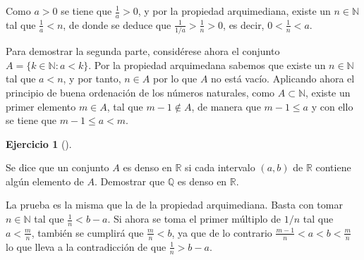 \documentclass[
  a4paper,
]{scrreport}
\theoremstyle{definition}
\newtheorem{exercise}{Ejercicio}[chapter]
\theoremstyle{remark}
\begin{document}
\begin{tcolorbox}[enhanced jigsaw, coltitle=black, toptitle=1mm, colframe=quarto-callout-tip-color-frame, colbacktitle=quarto-callout-tip-color!10!white, breakable, opacityback=0, bottomtitle=1mm, opacitybacktitle=0.6, title=\textcolor{quarto-callout-tip-color}{\faLightbulb}\hspace{0.5em}{Solución}, arc=.35mm, leftrule=.75mm, toprule=.15mm, titlerule=0mm, bottomrule=.15mm, left=2mm, rightrule=.15mm, colback=white]

Como \(a>0\) se tiene que \(\frac{1}{a}>0\), y por la propiedad
arquimediana, existe un \(n\in\mathbb{N}\) tal que \(\frac{1}{a}<n\), de
donde se deduce que \(\frac{1}{1/a}>\frac{1}{n}>0\), es decir,
\(0<\frac{1}{n}<a\).

Para demostrar la segunda parte, considérese ahora el conjunto
\(A=\{k\in \mathbb{N}: a<k\}\). Por la propiedad arquimedana sabemos que
existe un \(n\in \mathbb{N}\) tal que \(a<n\), y por tanto, \(n\in A\)
por lo que \(A\) no está vacío. Aplicando ahora el principio de buena
ordenación de los números naturales, como \(A\subset \mathbb{N}\),
existe un primer elemento \(m\in A\), tal que \(m-1\not\in A\), de
manera que \(m-1\leq a\) y con ello se tiene que \(m-1\leq a<m\).

\end{tcolorbox}

\begin{exercise}[]\protect\hypertarget{exr-densidad-racionales}{}\label{exr-densidad-racionales}

Se dice que un conjunto \(A\) es denso en \(\mathbb{R}\) si cada
intervalo \((a,b)\) de \(\mathbb{R}\) contiene algún elemento de \(A\).
Demostrar que \(\mathbb{Q}\) es denso en \(\mathbb{R}\).

\end{exercise}

\begin{tcolorbox}[enhanced jigsaw, coltitle=black, toptitle=1mm, colframe=quarto-callout-tip-color-frame, colbacktitle=quarto-callout-tip-color!10!white, breakable, opacityback=0, bottomtitle=1mm, opacitybacktitle=0.6, title=\textcolor{quarto-callout-tip-color}{\faLightbulb}\hspace{0.5em}{Solución}, arc=.35mm, leftrule=.75mm, toprule=.15mm, titlerule=0mm, bottomrule=.15mm, left=2mm, rightrule=.15mm, colback=white]

La prueba es la misma que la de la propiedad arquimediana. Basta con
tomar \(n\in \mathbb{N}\) tal que \(\frac{1}{n}< b-a\). Si ahora se toma
el primer múltiplo de \(1/n\) tal que \(a<\frac{m}{n}\), también se
cumplirá que \(\frac{m}{n}<b\), ya que de lo contrario
\(\frac{m-1}{n}<a<b<\frac{m}{n}\) lo que lleva a la contradicción de que
\(\frac{1}{n}>b-a\).

\end{tcolorbox}
\end{document}
